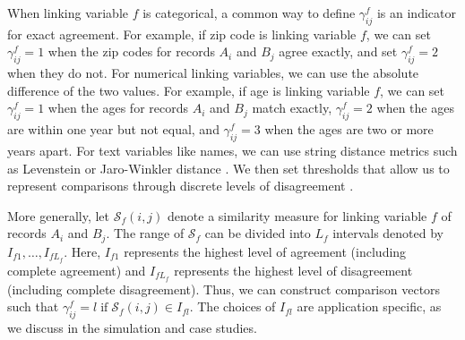 \documentclass[ba]{imsart}
\begin{document}
When linking variable $f$ is categorical, a common way to define $\gamma_{ij}^f$ is an indicator for exact agreement. For example, if zip code is linking variable $f$, we can set $\gamma_{ij}^f=1$ when the zip codes for records $A_i$ and $B_j$ agree exactly, and set $\gamma_{ij}^f=2$ when they do not. For numerical linking variables, we can use the absolute difference of the two values. For example, if age is linking variable $f$, we can set $\gamma_{ij}^f = 1$ when the ages for records $A_i$ and $B_j$ match exactly, $\gamma_{ij}^f = 2$ when the ages are within one year but not equal, and $\gamma_{ij}^f = 3$ when the ages are two or more years apart. For text variables like names, we can use string distance metrics such as Levenstein or Jaro-Winkler distance \citep{cohen2003comparison}. We then set thresholds that allow us to represent comparisons through discrete levels of disagreement \citep{bilenko2006riddle, elmagarmid_duplicate_2007}.

More generally, let $\mathcal{S}_f(i,j)$ denote a similarity measure for linking variable $f$ of records $A_i$ and $B_j.$ The range of $\mathcal{S}_f$ can be divided into $L_f$ intervals denoted by $I_{f1}, \ldots, I_{fL_f}$. Here, $I_{f1}$ represents the highest level of agreement (including complete agreement) and $I_{fL_f}$ represents the highest level of disagreement (including complete disagreement). Thus, we can construct comparison vectors such that $\gamma_{ij}^f = l \; \text{if} \; \mathcal{S}_f(i,j) \in I_{fl}.$ The choices of $I_{fl}$ are application specific, as we discuss in the simulation and case studies.


\end{document}
